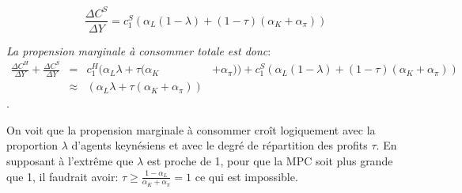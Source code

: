 \documentclass[
]{article}
\begin{document}
\[\frac{\Delta C^S}{\Delta Y}=c^S_1(\alpha_L (1-\lambda) + (1-\tau)(\alpha_K + \alpha_\pi))\]

\emph{La propension marginale à consommer totale est donc}:
\begin{align}\frac{\Delta C^H}{\Delta Y}+\frac{\Delta C^S}{\Delta Y} & = & c^H_1(\alpha_L \lambda + \tau(\alpha_K & + \alpha_\pi))+c^S_1(\alpha_L (1-\lambda) + (1-\tau)(\alpha_K + \alpha_\pi))\\
 & \approx & (\alpha_L \lambda + \tau(\alpha_K + \alpha_\pi)) &
\end{align}.

On voit que la propension marginale à consommer croît logiquement avec
la proportion \(\lambda\) d'agents keynésiens et avec le degré de
répartition des profits \(\tau\). En supposant à l'extrême que
\(\lambda\) est proche de 1, pour que la MPC soit plus grande que 1, il
faudrait avoir: \(\tau \geq \frac{1-\alpha_L}{\alpha_K+\alpha_{\pi}}=1\)
ce qui est impossible.
\end{document}
